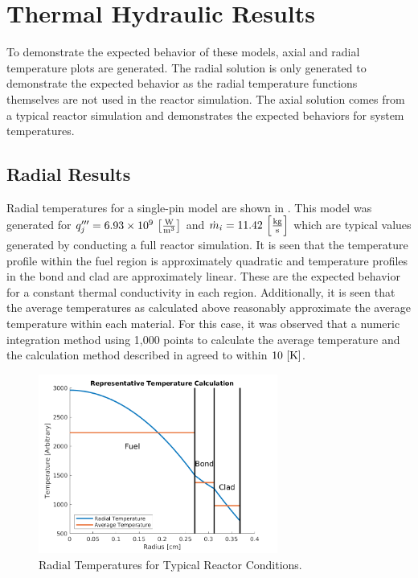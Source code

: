 \section{Thermal Hydraulic Results}
  To demonstrate the expected behavior of these models, axial and radial
  temperature plots are generated. The radial solution is only generated to
  demonstrate the expected behavior as the radial temperature functions
  themselves are not used in the reactor simulation. The axial solution comes
  from a typical reactor simulation and demonstrates the expected behaviors for
  system temperatures.

  \subsection{Radial Results}
    Radial temperatures for a single-pin model are shown in
    . This model was generated for 
    ${q'''_j = 6.93 \times 10^9 \,\left[\text{{$\frac{\text{W}}{\text{m}^3}$}}\right]}$ and 
    $\dot{m}_i = 11.42 \,\left[\text{{$\frac{\text{kg}}{\text{s}}$}}\right]$ which are typical 
    values generated by conducting a full reactor simulation. It is seen
    that the temperature profile within the fuel region is approximately 
    quadratic and temperature profiles in the bond and clad are approximately
    linear. These are the expected behavior for a constant thermal conductivity
    in each region. Additionally, it is seen that the average temperatures as
    calculated above reasonably approximate the average temperature within each
    material. For this case, it was observed that a numeric integration method
    using 1,000 points to calculate the average temperature and the calculation
    method described in  agreed to within 
    $10 \,\left[\text{{K}}\right]$.

    \begin{figure}
      \centering
      \includegraphics[width=0.7\textwidth]{radial_temp_plot}
      \caption{Radial Temperatures for Typical Reactor Conditions.}
      \label{fig:radial_temp_plot}
    \end{figure}

